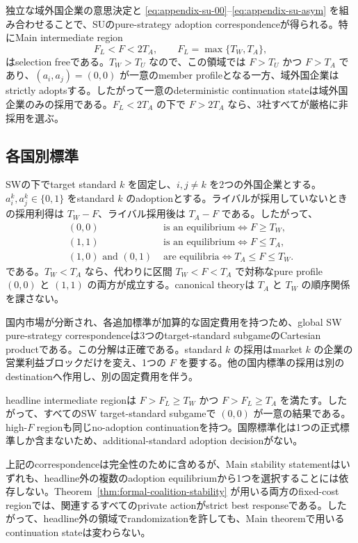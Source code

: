独立な域外国企業の意思決定と \eqref{eq:appendix-su-00}--\eqref{eq:appendix-su-asym} を組み合わせることで、SUのpure-strategy adoption correspondenceが得られる。特にMain intermediate region
\[
F_L<F<2T_A,
\qquad F_L=\max\{T_W,T_A\},
\]
はselection freeである。$T_W>T_U$ なので、この領域では $F>T_U$ かつ $F>T_A$ であり、$(a_i,a_j)=(0,0)$ が一意のmember profileとなる一方、域外国企業はstrictly adoptsする。したがって一意のdeterministic continuation stateは域外国企業のみの採用である。$F_L<2T_A$ の下で $F>2T_A$ なら、3社すべてが厳格に非採用を選ぶ。

\subsection{各国別標準}

SWの下でtarget standard $k$ を固定し、$i,j\ne k$ を2つの外国企業とする。$a_i^k,a_j^k\in\{0,1\}$ をstandard $k$ のadoptionとする。ライバルが採用していないときの採用利得は $T_W-F$、ライバル採用後は $T_A-F$ である。したがって、
\begin{align}
(0,0)&\text{ is an equilibrium}\iff F\ge T_W,\label{eq:appendix-sw-00}\\
(1,1)&\text{ is an equilibrium}\iff F\le T_A,\label{eq:appendix-sw-11}\\
(1,0)\text{ and }(0,1)&\text{ are equilibria}\iff T_A\le F\le T_W.\label{eq:appendix-sw-asym}
\end{align}
である。$T_W<T_A$ なら、代わりに区間 $T_W<F<T_A$ で対称なpure profile $(0,0)$ と $(1,1)$ の両方が成立する。canonical theoryは $T_A$ と $T_W$ の順序関係を課さない。

国内市場が分断され、各追加標準が加算的な固定費用を持つため、global SW pure-strategy correspondenceは3つのtarget-standard subgameのCartesian productである。この分解は正確である。standard $k$ の採用はmarket $k$ の企業の営業利益ブロックだけを変え、1つの $F$ を要する。他の国内標準の採用は別のdestinationへ作用し、別の固定費用を伴う。

headline intermediate regionは $F>F_L\ge T_W$ かつ $F>F_L\ge T_A$ を満たす。したがって、すべてのSW target-standard subgameで $(0,0)$ が一意の結果である。high-$F$ regionも同じno-adoption continuationを持つ。国際標準化は1つの正式標準しか含まないため、additional-standard adoption decisionがない。

上記のcorrespondenceは完全性のために含めるが、Main stability statementはいずれも、headline外の複数のadoption equilibriumから1つを選択することには依存しない。Theorem~\ref{thm:formal-coalition-stability} が用いる両方のfixed-cost regionでは、関連するすべてのprivate actionがstrict best responseである。したがって、headline外の領域でrandomizationを許しても、Main theoremで用いるcontinuation stateは変わらない。
